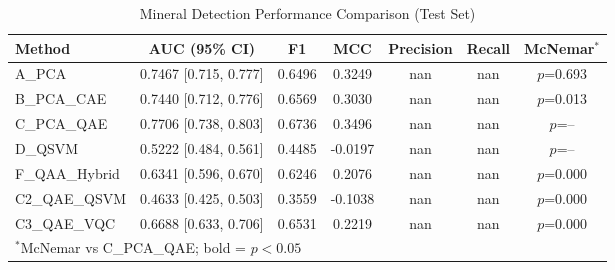 \begin{table}[htbp]
\centering
\caption{Mineral Detection Performance Comparison (Test Set)}
\label{tab:results}
\begin{tabular}{lcccccc}
\toprule
Method & AUC (95\% CI) & F1 & MCC & Precision & Recall & McNemar$^*$ \\
\midrule
A_PCA & 0.7467 [0.715, 0.777] & 0.6496 & 0.3249 & nan & nan & $p$=0.693 \\
B_PCA_CAE & 0.7440 [0.712, 0.776] & 0.6569 & 0.3030 & nan & nan & $p$=0.013 \\
C_PCA_QAE & 0.7706 [0.738, 0.803] & 0.6736 & 0.3496 & nan & nan & $p$=-- \\
D_QSVM & 0.5222 [0.484, 0.561] & 0.4485 & -0.0197 & nan & nan & $p$=-- \\
F_QAA_Hybrid & 0.6341 [0.596, 0.670] & 0.6246 & 0.2076 & nan & nan & $p$=0.000 \\
C2_QAE_QSVM & 0.4633 [0.425, 0.503] & 0.3559 & -0.1038 & nan & nan & $p$=0.000 \\
C3_QAE_VQC & 0.6688 [0.633, 0.706] & 0.6531 & 0.2219 & nan & nan & $p$=0.000 \\
\bottomrule
\multicolumn{7}{l}{\footnotesize $^*$McNemar vs C\_PCA\_QAE; bold = $p < 0.05$}\\
\end{tabular}
\end{table}
